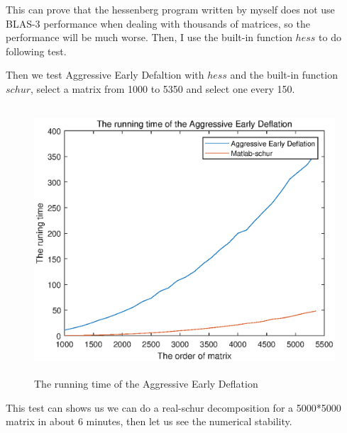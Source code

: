 This can prove that the hessenberg program written by myself does not use BLAS-3 performance when dealing with thousands of matrices, so the performance will be much worse. Then, I use the built-in function \(hess\) to do following test.

Then we test Aggressive Early Defaltion with \(hess\) and the built-in function \(schur\), select a matrix from 1000 to 5350 and select one every 150.
\begin{figure}[H]
\centering
\includegraphics[height=10cm]{The running time of the Aggressive Early Deflation.eps}
\caption{The running time of the Aggressive Early Deflation}
\label{4}
\end{figure}

This test can shows us we can do a real-schur decomposition for a 5000*5000 matrix in about 6 minutes, then let us see the numerical stability.

